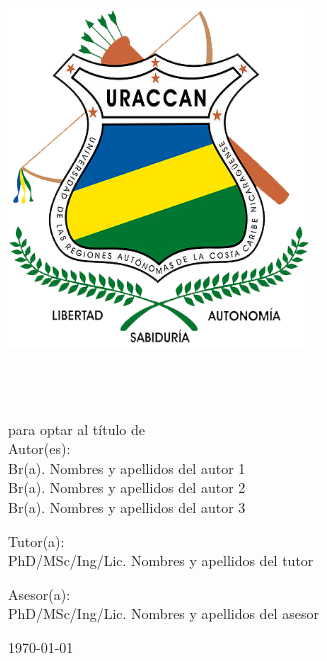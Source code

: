 \begin{titlepage}
    \centering
    \begin{minipage}{0.2\textwidth}
        \centering
        \includegraphics[width=0.6\textwidth]{images/uraccan_logo.png}
    \end{minipage}%
    \begin{minipage}{0.8\textwidth}
        \centering
        \Large{\textbf{\universidad}}\\
    \end{minipage}

    \vfill
    \tipoinvestigacion\\para optar al título de \tituloopta\\

    \vfill
    Autor(es):\\
    Br(a). Nombres y apellidos del autor 1\\
    Br(a). Nombres y apellidos del autor 2\\
    Br(a). Nombres y apellidos del autor 3

    \vfill
    Tutor(a):\\
    PhD/MSc/Ing/Lic. Nombres y apellidos del tutor

    \vfill
    Asesor(a):\\
    PhD/MSc/Ing/Lic. Nombres y apellidos del asesor

    \vfill
    \small{\today{}}\\
\end{titlepage}